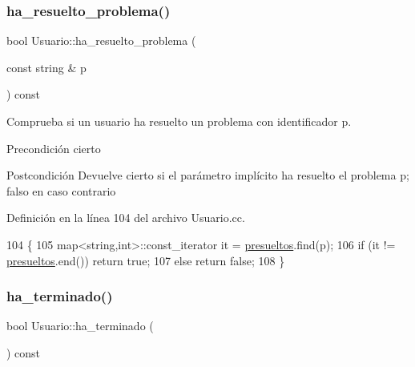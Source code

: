 \subsubsection{\texorpdfstring{ha\+\_\+resuelto\+\_\+problema()}{ha\_resuelto\_problema()}}
{\footnotesize\ttfamily bool Usuario\+::ha\+\_\+resuelto\+\_\+problema (\begin{DoxyParamCaption}\item[{const string \&}]{p }\end{DoxyParamCaption}) const}



Comprueba si un usuario ha resuelto un problema con identificador p. 

\begin{DoxyPrecond}{Precondición}
cierto 
\end{DoxyPrecond}
\begin{DoxyPostcond}{Postcondición}
Devuelve cierto si el parámetro implícito ha resuelto el problema p; falso en caso contrario 
\end{DoxyPostcond}


Definición en la línea 104 del archivo Usuario.\+cc.


\begin{DoxyCode}
104                                                               \{
105         map<string,int>::const\_iterator it = \mbox{\hyperlink{class_usuario_ae614e565ce48a314a1e2b05beee8567b}{presueltos}}.find(p);
106         \textcolor{keywordflow}{if} (it != \mbox{\hyperlink{class_usuario_ae614e565ce48a314a1e2b05beee8567b}{presueltos}}.end()) \textcolor{keywordflow}{return} \textcolor{keyword}{true};
107         \textcolor{keywordflow}{else} \textcolor{keywordflow}{return} \textcolor{keyword}{false};
108       \}
\end{DoxyCode}
\mbox{\label{class_usuario_aae8ff05308f5cc1e5f4267c577da386e}} 
\subsubsection{\texorpdfstring{ha\+\_\+terminado()}{ha\_terminado()}}
{\footnotesize\ttfamily bool Usuario\+::ha\+\_\+terminado (\begin{DoxyParamCaption}{ }\end{DoxyParamCaption}) const}



